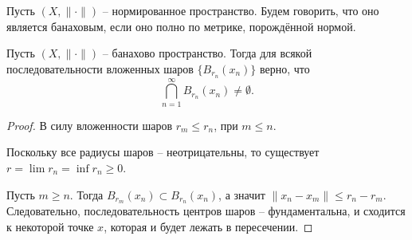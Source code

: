 \begin{definition}
    Пусть $(X, \|\cdot\|)$ -- нормированное пространство.
    Будем говорить, что оно является банаховым, если оно полно по метрике, порождённой нормой.
\end{definition}
\begin{theorem}
    Пусть $(X, \|\cdot\|)$ -- банахово пространство.
    Тогда для всякой последовательности вложенных шаров $\{B_{r_n}(x_n)\}$ верно, что
    \[
        \bigcap_{n = 1}^{\infty} B_{r_n}(x_n) \neq \emptyset.
    \]
\end{theorem}
\begin{proof}
    В силу вложенности шаров $r_m \leq r_n$, при $m \leq n$.

    Поскольку все радиусы шаров -- неотрицательны, то существует $r = \lim r_n = \inf r_n \geq 0$.

    Пусть $m \geq n$.
    Тогда $B_{r_m}(x_n) \subset B_{r_n}(x_n)$, а значит $\|x_n - x_m\| \leq r_n - r_m$.
    Следовательно, последовательность центров шаров -- фундаментальна, и сходится к некоторой точке $x$, которая и будет лежать в пересечении.
\end{proof}